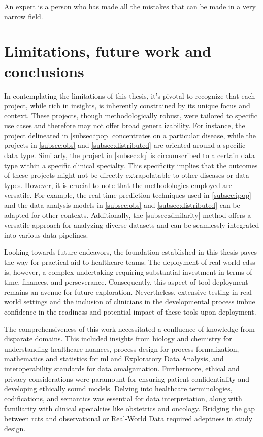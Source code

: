 
\begin{savequote}[75mm]
An expert is a person who has made all the mistakes that can be made in a very narrow field.
\end{savequote}
\chapter{Limitations, future work and conclusions} \label{chap:conclusion}

In contemplating the limitations of this thesis, it's pivotal to recognize that each project, while rich in insights, is inherently constrained by its unique focus and context. These projects, though methodologically robust, were tailored to specific use cases and therefore may not offer broad generalizability. For instance, the project delineated in \ref{subsec:ipop} concentrates on a particular disease, while the projects in \ref{subsec:obs} and \ref{subsec:distributed} are oriented around a specific data type. Similarly, the project in \ref{subsec:dq} is circumscribed to a certain data type within a specific clinical specialty. This specificity implies that the outcomes of these projects might not be directly extrapolatable to other diseases or data types. However, it is crucial to note that the methodologies employed are versatile. For example, the real-time prediction techniques used in \ref{subsec:ipop} and the data analysis models in \ref{subsec:obs} and \ref{subsec:distributed} can be adapted for other contexts. Additionally, the \ref{subsec:similarity} method offers a versatile approach for analyzing diverse datasets and can be seamlessly integrated into various data pipelines.

Looking towards future endeavors, the foundation established in this thesis paves the way for practical aid to healthcare teams. The deployment of real-world \ac{cdss} is, however, a complex undertaking requiring substantial investment in terms of time, finances, and perseverance. Consequently, this aspect of tool deployment remains an avenue for future exploration. Nevertheless, extensive testing in real-world settings and the inclusion of clinicians in the developmental process imbue confidence in the readiness and potential impact of these tools upon deployment.


The comprehensiveness of this work necessitated a confluence of knowledge from disparate domains. This included insights from biology and chemistry for understanding healthcare nuances, process design for process formalization, mathematics and statistics for \ac{ml} and Exploratory Data Analysis, and interoperability standards for data amalgamation. Furthermore, ethical and privacy considerations were paramount for ensuring patient confidentiality and developing ethically sound models. Delving into healthcare terminologies, codifications, and semantics was essential for data interpretation, along with familiarity with clinical specialties like obstetrics and oncology. Bridging the gap between \acp{rct} and observational or Real-World Data required adeptness in study design.

